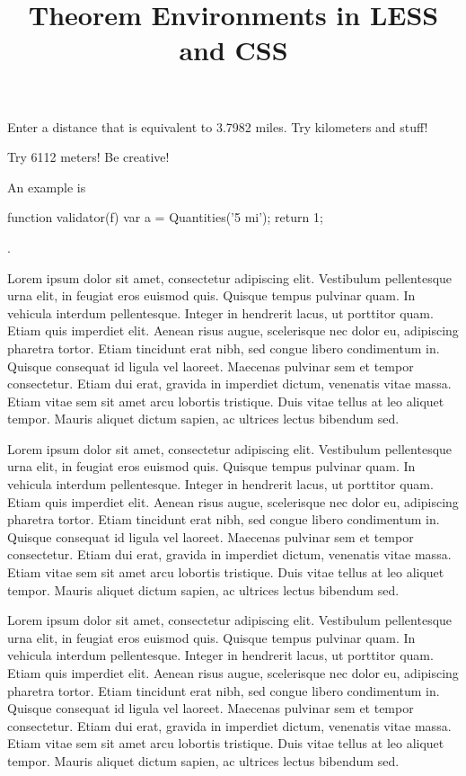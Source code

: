 \documentclass{ximera}
\begin{document}
\title{Theorem Environments in LESS and CSS}

\begin{exercise}
Enter a distance that is equivalent to 3.7982 miles. Try kilometers and stuff!

\begin{solution}
\begin{hint}
Try 6112 meters! Be creative!
\end{hint}
An example is \begin{expression-answer}
	function validator(f) {	
		var a = Quantities('5 mi');		
		return 1;
	}
\end{expression-answer}.
\end{solution}

\end{exercise}


\begin{theorem}Lorem ipsum dolor sit amet, consectetur adipiscing elit. Vestibulum pellentesque urna elit, in feugiat eros euismod quis. Quisque tempus pulvinar quam. In vehicula interdum pellentesque. Integer in hendrerit lacus, ut porttitor quam. Etiam quis imperdiet elit. Aenean risus augue, scelerisque nec dolor eu, adipiscing pharetra tortor. Etiam tincidunt erat nibh, sed congue libero condimentum in. Quisque consequat id ligula vel laoreet. Maecenas pulvinar sem et tempor consectetur. Etiam dui erat, gravida in imperdiet dictum, venenatis vitae massa. Etiam vitae sem sit amet arcu lobortis tristique. Duis vitae tellus at leo aliquet tempor. Mauris aliquet dictum sapien, ac ultrices lectus bibendum sed.\end{theorem}
\begin{axiom}Lorem ipsum dolor sit amet, consectetur adipiscing elit. Vestibulum pellentesque urna elit, in feugiat eros euismod quis. Quisque tempus pulvinar quam. In vehicula interdum pellentesque. Integer in hendrerit lacus, ut porttitor quam. Etiam quis imperdiet elit. Aenean risus augue, scelerisque nec dolor eu, adipiscing pharetra tortor. Etiam tincidunt erat nibh, sed congue libero condimentum in. Quisque consequat id ligula vel laoreet. Maecenas pulvinar sem et tempor consectetur. Etiam dui erat, gravida in imperdiet dictum, venenatis vitae massa. Etiam vitae sem sit amet arcu lobortis tristique. Duis vitae tellus at leo aliquet tempor. Mauris aliquet dictum sapien, ac ultrices lectus bibendum sed.\end{axiom}
\begin{conjecture}Lorem ipsum dolor sit amet, consectetur adipiscing elit. Vestibulum pellentesque urna elit, in feugiat eros euismod quis. Quisque tempus pulvinar quam. In vehicula interdum pellentesque. Integer in hendrerit lacus, ut porttitor quam. Etiam quis imperdiet elit. Aenean risus augue, scelerisque nec dolor eu, adipiscing pharetra tortor. Etiam tincidunt erat nibh, sed congue libero condimentum in. Quisque consequat id ligula vel laoreet. Maecenas pulvinar sem et tempor consectetur. Etiam dui erat, gravida in imperdiet dictum, venenatis vitae massa. Etiam vitae sem sit amet arcu lobortis tristique. Duis vitae tellus at leo aliquet tempor. Mauris aliquet dictum sapien, ac ultrices lectus bibendum sed.\end{conjecture}
\end{document}
